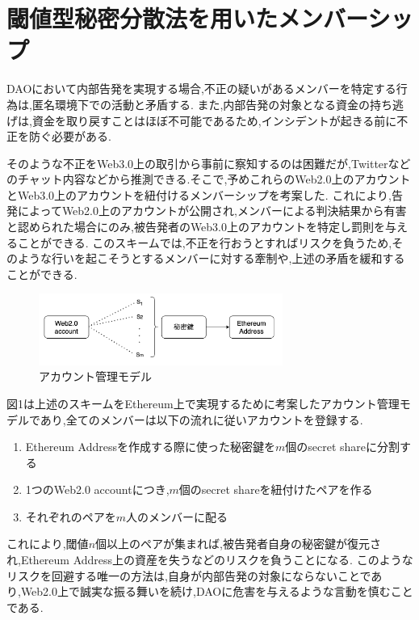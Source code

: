 \documentclass[twocolumn,10pt]{jarticle}
\begin{document}
\section{\normalsize 閾値型秘密分散法を用いたメンバーシップ}
\vspace{-0.2cm}
DAOにおいて内部告発を実現する場合,不正の疑いがあるメンバーを特定する行為は,匿名環境下での活動と矛盾する.
また,内部告発の対象となる資金の持ち逃げは,資金を取り戻すことはほぼ不可能であるため,インシデントが起きる前に不正を防ぐ必要がある.

そのような不正をWeb3.0上の取引から事前に察知するのは困難だが,Twitterなどのチャット内容などから推測できる.そこで,予めこれらのWeb2.0上のアカウントとWeb3.0上のアカウントを紐付けるメンバーシップを考案した.
これにより,告発によってWeb2.0上のアカウントが公開され,メンバーによる判決結果から有害と認められた場合にのみ,被告発者のWeb3.0上のアカウントを特定し罰則を与えることができる.
このスキームでは,不正を行おうとすればリスクを負うため,そのような行いを起こそうとするメンバーに対する牽制や,上述の矛盾を緩和することができる.

\begin{figure}[htbp]
  \begin{center}
    \includegraphics[width=80mm]{share.png}
    \caption{アカウント管理モデル}
  \end{center}
\end{figure}

図1は上述のスキームをEthereum上で実現するために考案したアカウント管理モデルであり,全てのメンバーは以下の流れに従いアカウントを登録する.
\begin{enumerate}
  \vspace{-5pt}
  \item Ethereum Addressを作成する際に使った秘密鍵を$m$個のsecret shareに分割する\vspace{-5pt}
  \item 1つのWeb2.0 accountにつき,$m$個のsecret shareを紐付けたペアを作る\vspace{-5pt}
  \item それぞれのペアを$m$人のメンバーに配る\vspace{-5pt}
\end{enumerate}

これにより,閾値$n$個以上のペアが集まれば,被告発者自身の秘密鍵が復元され,Ethereum Address上の資産を失うなどのリスクを負うことになる.
このようなリスクを回避する唯一の方法は,自身が内部告発の対象にならないことであり,Web2.0上で誠実な振る舞いを続け,DAOに危害を与えるような言動を慎むことである.
\end{document}
